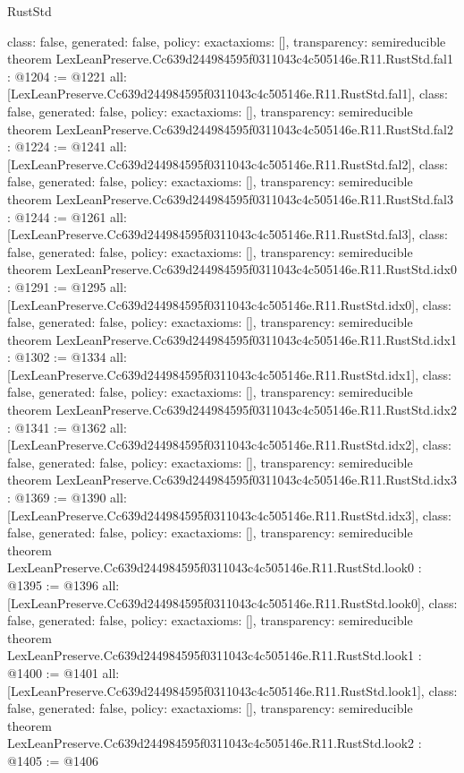 \begin{lexlean}{RustStd}
\begin{coremodule}
{  class: false,
  generated: false,
  policy: exact{axioms: []},
  transparency: semireducible
}
theorem LexLeanPreserve.Cc639d244984595f0311043c4c505146e.R11.RustStd.fal1 : @1204 := @1221 {
  all: [LexLeanPreserve.Cc639d244984595f0311043c4c505146e.R11.RustStd.fal1],
  class: false,
  generated: false,
  policy: exact{axioms: []},
  transparency: semireducible
}
theorem LexLeanPreserve.Cc639d244984595f0311043c4c505146e.R11.RustStd.fal2 : @1224 := @1241 {
  all: [LexLeanPreserve.Cc639d244984595f0311043c4c505146e.R11.RustStd.fal2],
  class: false,
  generated: false,
  policy: exact{axioms: []},
  transparency: semireducible
}
theorem LexLeanPreserve.Cc639d244984595f0311043c4c505146e.R11.RustStd.fal3 : @1244 := @1261 {
  all: [LexLeanPreserve.Cc639d244984595f0311043c4c505146e.R11.RustStd.fal3],
  class: false,
  generated: false,
  policy: exact{axioms: []},
  transparency: semireducible
}
theorem LexLeanPreserve.Cc639d244984595f0311043c4c505146e.R11.RustStd.idx0 : @1291 := @1295 {
  all: [LexLeanPreserve.Cc639d244984595f0311043c4c505146e.R11.RustStd.idx0],
  class: false,
  generated: false,
  policy: exact{axioms: []},
  transparency: semireducible
}
theorem LexLeanPreserve.Cc639d244984595f0311043c4c505146e.R11.RustStd.idx1 : @1302 := @1334 {
  all: [LexLeanPreserve.Cc639d244984595f0311043c4c505146e.R11.RustStd.idx1],
  class: false,
  generated: false,
  policy: exact{axioms: []},
  transparency: semireducible
}
theorem LexLeanPreserve.Cc639d244984595f0311043c4c505146e.R11.RustStd.idx2 : @1341 := @1362 {
  all: [LexLeanPreserve.Cc639d244984595f0311043c4c505146e.R11.RustStd.idx2],
  class: false,
  generated: false,
  policy: exact{axioms: []},
  transparency: semireducible
}
theorem LexLeanPreserve.Cc639d244984595f0311043c4c505146e.R11.RustStd.idx3 : @1369 := @1390 {
  all: [LexLeanPreserve.Cc639d244984595f0311043c4c505146e.R11.RustStd.idx3],
  class: false,
  generated: false,
  policy: exact{axioms: []},
  transparency: semireducible
}
theorem LexLeanPreserve.Cc639d244984595f0311043c4c505146e.R11.RustStd.look0 : @1395 := @1396 {
  all: [LexLeanPreserve.Cc639d244984595f0311043c4c505146e.R11.RustStd.look0],
  class: false,
  generated: false,
  policy: exact{axioms: []},
  transparency: semireducible
}
theorem LexLeanPreserve.Cc639d244984595f0311043c4c505146e.R11.RustStd.look1 : @1400 := @1401 {
  all: [LexLeanPreserve.Cc639d244984595f0311043c4c505146e.R11.RustStd.look1],
  class: false,
  generated: false,
  policy: exact{axioms: []},
  transparency: semireducible
}
theorem LexLeanPreserve.Cc639d244984595f0311043c4c505146e.R11.RustStd.look2 : @1405 := @1406 {
}
\end{coremodule}
\end{lexlean}
